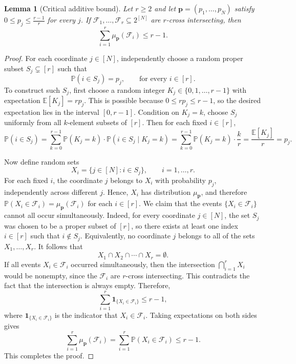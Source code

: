 \documentclass[11pt]{article}
\newtheorem{lemma}[theorem]{Lemma}
\begin{document}
\begin{lemma}[Critical additive bound]\label{lem:additive}
Let $r\ge2$ and let $\mathbf p=(p_1,\ldots,p_N)$ satisfy
$0\le p_j\le\frac{r-1}{r}$ for every $j$. If
$\mathcal{F}_1,\ldots,\mathcal{F}_r\subseteq2^{[N]}$ are $r$-cross intersecting, then
$$
 \sum_{i=1}^r\mu_{\mathbf p}(\mathcal{F}_i)\le r-1.
$$
\end{lemma}
\begin{proof}

For each coordinate $j\in[N]$,  independently choose a random proper subset
$S_j\subsetneq[r]$ such that
$$
 \mathbb P(i\in S_j)=p_j,\qquad\text{for every }i\in[r].
$$
To construct such $S_j$, first choose a random integer $K_j\in\{0,1,\ldots,r-1\}$ with expectation
$
\mathbb E[K_j]=r p_j.
$
This is possible because $0\le r p_j\le r-1$, so the desired expectation lies in the interval $[0,r-1]$. Condition on  $K_j=k$, choose $S_j$ uniformly from all $k$-element subsets of $[r]$. Then for each fixed $i\in[r]$,
$$
\mathbb P(i\in S_j)
=\sum_{k=0}^{r-1}\mathbb P(K_j=k)\cdot \mathbb P(i\in S_j\mid K_j=k)
=\sum_{k=0}^{r-1}\mathbb P(K_j=k)\cdot \frac{k}{r}
=\frac{\mathbb E[K_j]}{r}
=p_j.
$$

Now define random sets
$$
X_i=\{j\in[N]: i\in S_j\},\qquad i=1,\ldots,r.
$$
For each fixed $i$, the coordinate $j$ belongs to $X_i$ with probability $p_j$, independently across different $j$. Hence, $X_i$ has distribution $\mu_{\mathbf p}$, and therefore
$
\mathbb P(X_i\in\mathcal F_i)=\mu_{\mathbf p}(\mathcal F_i)
$
for each $i\in[r]$.
We claim that the events $\{X_i\in\mathcal F_i\}$ cannot all occur simultaneously. Indeed, for every coordinate $j\in[N]$, the set $S_j$ was chosen to be a proper subset of $[r]$, so there exists at least one index $i\in[r]$ such that $i\notin S_j$. Equivalently, no coordinate $j$ belongs to all of the sets $X_1,\ldots,X_r$. It follows that
$$
X_1\cap X_2\cap\cdots\cap X_r=\emptyset.
$$
 If all events $X_i\in\mathcal F_i$ occurred simultaneously, then the intersection $\bigcap_{i=1}^r X_i$ would be nonempty, since the $\mathcal F_i$ are $r$-cross intersecting. This contradicts the fact that the intersection is always empty. Therefore, 
$$
\sum_{i=1}^r \mathbf 1_{\{X_i\in\mathcal F_i\}}\le r-1,
$$
where $\mathbf 1_{\{X_i\in\mathcal F_i\}}$ is the indicator that $X_i\in\mathcal F_i$.
Taking expectations on both sides gives
$$
\sum_{i=1}^r \mu_{\mathbf p}(\mathcal F_i)=\sum_{i=1}^r \mathbb P(X_i\in\mathcal F_i)\le r-1.
$$
This completes the proof.
\end{proof}
\end{document}

